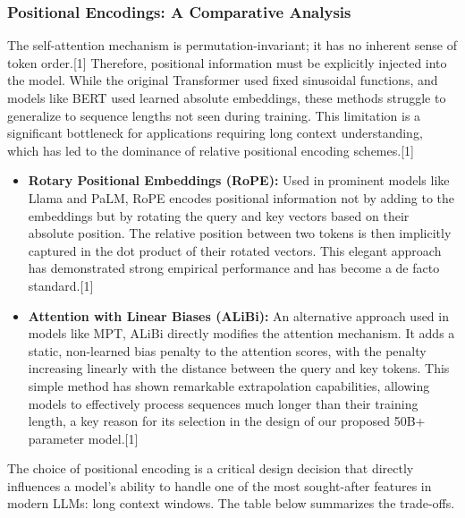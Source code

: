 \documentclass[12pt, a4paper]{article}
\begin{document}
\subsubsection{Positional Encodings: A Comparative Analysis}

The self-attention mechanism is permutation-invariant; it has no inherent sense of token order.[1] Therefore, positional information must be explicitly injected into the model. While the original Transformer used fixed sinusoidal functions, and models like BERT used learned absolute embeddings, these methods struggle to generalize to sequence lengths not seen during training. This limitation is a significant bottleneck for applications requiring long context understanding, which has led to the dominance of relative positional encoding schemes.[1]

\begin{itemize}
    \item \textbf{Rotary Positional Embeddings (RoPE):} Used in prominent models like Llama and PaLM, RoPE encodes positional information not by adding to the embeddings but by rotating the query and key vectors based on their absolute position. The relative position between two tokens is then implicitly captured in the dot product of their rotated vectors. This elegant approach has demonstrated strong empirical performance and has become a de facto standard.[1]
    \item \textbf{Attention with Linear Biases (ALiBi):} An alternative approach used in models like MPT, ALiBi directly modifies the attention mechanism. It adds a static, non-learned bias penalty to the attention scores, with the penalty increasing linearly with the distance between the query and key tokens. This simple method has shown remarkable extrapolation capabilities, allowing models to effectively process sequences much longer than their training length, a key reason for its selection in the design of our proposed 50B+ parameter model.[1]
\end{itemize}

The choice of positional encoding is a critical design decision that directly influences a model's ability to handle one of the most sought-after features in modern LLMs: long context windows. The table below summarizes the trade-offs.
\end{document}
